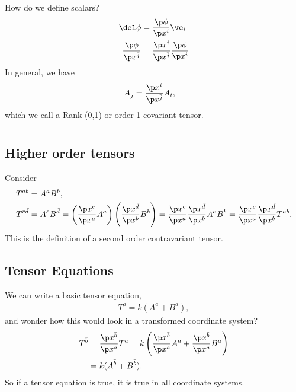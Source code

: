 \documentclass[a4paper, 11pt, normalem]{report}
\begin{document}
How do we define scalars?
\begin{align}
    \del\phi &= \frac{\p\phi}{\p x^i}\ve_i \\
    \frac{\p\phi}{\p x^{\bar{j}}} &= \frac{\p x^i}{\p x^{\bar{j}}}\frac{\p\phi}{\p x^i}
\end{align}
In general, we have
\begin{align}
    A_{\bar{j}} &= \frac{\p x^i}{\p x^{\bar{j}}}A_i,
\end{align}
which we call a Rank (0,1) or order 1 covariant tensor.

\chapter{}

\section{Higher order tensors}
Consider
\begin{align}
    T^{ab} &= A^aB^b, \\
    T^{\bar{c}\bar{d}} &= A^{\bar{c}}B^{\bar{d}} = \left(\frac{\p x^{\bar{c}}}{\p x^a}A^a\right)\left(\frac{\p x^{\bar{d}}}{\p x^b}B^b\right) = \frac{\p x^{\bar{c}}}{\p x^a}\frac{\p x^{\bar{d}}}{\p x^b}A^a B^b = \frac{\p x^{\bar{c}}}{\p x^a}\frac{\p x^{\bar{d}}}{\p x^b}T^{ab}.
\end{align}
This is the definition of a second order contravariant tensor.

\section{Tensor Equations}
We can write a basic tensor equation,
\begin{align}
    T^a = k(A^a+B^a),
\end{align}
and wonder how this would look in a transformed coordinate system?
\begin{align}
    T^{\bar{b}} &= \frac{\p x^{\bar{b}}}{\p x^a}T^a = k\left(\frac{\p x^{\bar{b}}}{\p x^a}A^a + \frac{\p x^{\bar{b}}}{\p x^a}B^a\right) \\
                &= k(A^{\bar{b}}+B^{\bar{b}}).
\end{align}
So if a tensor equation is true, it is true in all coordinate systems.
\end{document}
